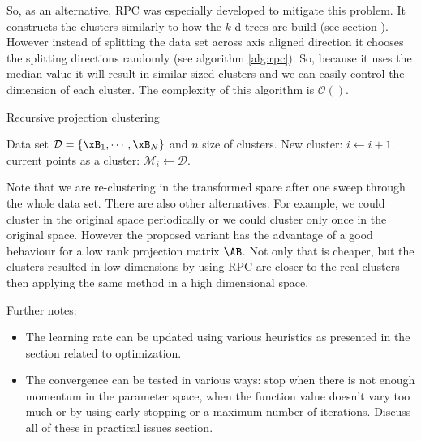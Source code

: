 \begin{enumerate}
	So, as an alternative, RPC was especially developed to mitigate this problem.
It constructs the clusters similarly to how the $k$-d trees are build (see
section ). However instead of splitting the data set across axis aligned
direction it chooses the splitting directions randomly (see algorithm
\ref{alg:rpc}). So, because it uses the median value it will result in similar
sized clusters and we can easily control the dimension of each cluster. The
complexity of this algorithm is $\mathcal{O}()$.
	
	\begin{algorithm} 
		\caption{Recursive projection clustering} 
		\label{alg:rpc}  
		\begin{algorithmic}                    %
			\REQUIRE Data set $\mathcal{D}=\{\xB_1,\cdots,\xB_N\}$ and $n$ size of
clusters.
				\STATE New cluster: $i\leftarrow i+1$.
				\RETURN current points as a cluster: $\mathcal{M}_i \leftarrow \mathcal{D}$.
			\ELSE
			\ENDIF
		\end{algorithmic}
	\end{algorithm}
	
	Note that we are re-clustering in the transformed space after one sweep through
the whole data set. There are also other alternatives. For example, we could
cluster in the original space periodically or we could cluster only once in the
original space. However the proposed variant has the advantage of a good
behaviour for a low rank projection matrix $\AB$. Not only that is cheaper, but
the clusters resulted in low dimensions by using RPC are closer to the real
clusters then applying the same method in a high dimensional space. 
	
	Further notes:
	\begin{itemize}
		\item The learning rate can be updated using various heuristics as presented
in the section related to optimization.
		\item The convergence can be tested in various ways: stop when there is not
enough momentum in the parameter space, when the function value doesn't vary too
much or by using early stopping or a maximum number of iterations. Discuss all
of these in practical issues section.
	\end{itemize}
	
\end{enumerate}

